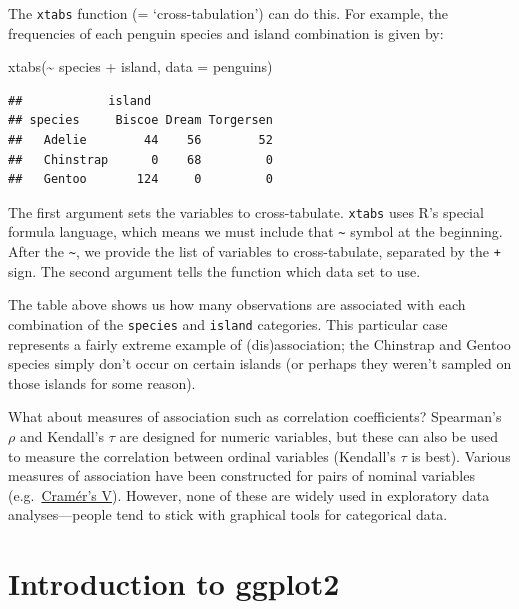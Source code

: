 \documentclass[
]{book}
\newenvironment{Shaded}{\begin{snugshade}}{\end{snugshade}}
\newcommand{\AttributeTok}[1]{\textcolor[rgb]{0.77,0.63,0.00}{#1}}
\newcommand{\FunctionTok}[1]{\textcolor[rgb]{0.00,0.00,0.00}{#1}}
\newcommand{\NormalTok}[1]{#1}
\newcommand{\SpecialCharTok}[1]{\textcolor[rgb]{0.00,0.00,0.00}{#1}}
\begin{document}
The \texttt{xtabs} function (= `cross-tabulation') can do this. For example, the frequencies of each penguin species and island combination is given by:

\begin{Shaded}
\begin{Highlighting}[]
\FunctionTok{xtabs}\NormalTok{(}\SpecialCharTok{\textasciitilde{}}\NormalTok{ species }\SpecialCharTok{+}\NormalTok{ island, }\AttributeTok{data =}\NormalTok{ penguins)}
\end{Highlighting}
\end{Shaded}

\begin{verbatim}
##            island
## species     Biscoe Dream Torgersen
##   Adelie        44    56        52
##   Chinstrap      0    68         0
##   Gentoo       124     0         0
\end{verbatim}

The first argument sets the variables to cross-tabulate. \texttt{xtabs} uses R's special formula language, which means we must include that \texttt{\textasciitilde{}} symbol at the beginning. After the \texttt{\textasciitilde{}}, we provide the list of variables to cross-tabulate, separated by the \texttt{+} sign. The second argument tells the function which data set to use.

The table above shows us how many observations are associated with each combination of the \texttt{species} and \texttt{island} categories. This particular case represents a fairly extreme example of (dis)association; the Chinstrap and Gentoo species simply don't occur on certain islands (or perhaps they weren't sampled on those islands for some reason).

What about measures of association such as correlation coefficients? Spearman's \(\rho\) and Kendall's \(\tau\) are designed for numeric variables, but these can also be used to measure the correlation between ordinal variables (Kendall's \(\tau\) is best). Various measures of association have been constructed for pairs of nominal variables (e.g.~\href{https://en.wikipedia.org/wiki/Cram\%C3\%A9r\%27s_V}{Cramér's V}). However, none of these are widely used in exploratory data analyses---people tend to stick with graphical tools for categorical data.

\hypertarget{chapter-ggplot2-intro}{%
\chapter{\texorpdfstring{Introduction to \textbf{ggplot2}}{Introduction to ggplot2}}\label{chapter-ggplot2-intro}}
\end{document}
